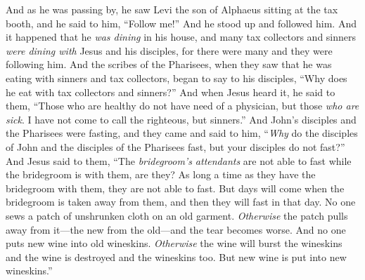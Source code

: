 \begin{biblechapter}
\verse And as he was passing by, he saw Levi the son of Alphaeus sitting at the tax booth, and he said to him, “Follow me!” And he stood up and followed him.
\verse And it happened that he \textit{was dining} in his house, and many tax collectors and sinners \textit{were dining with} Jesus and his disciples, for there were many and they were following him.
\verse And the scribes of the Pharisees, when they saw that he was eating with sinners and tax collectors, began to say to his disciples, “Why does he eat with tax collectors and sinners?”
\verse And when Jesus heard it, he said to them, “Those who are healthy do not have need of a physician, but those \textit{who are sick}. I have not come to call the righteous, but sinners.”
 And John’s disciples and the Pharisees were fasting, and they came and said to him, “\textit{Why} do the disciples of John and the disciples of the Pharisees fast, but your disciples do not fast?”
\verse And Jesus said to them, “The \textit{bridegroom’s attendants} are not able to fast while the bridegroom is with them, are they? As long a time as they have the bridegroom with them, they are not able to fast.
\verse But days will come when the bridegroom is taken away from them, and then they will fast in that day.
\verse No one sews a patch of unshrunken cloth on an old garment. \textit{Otherwise} the patch pulls away from it—the new from the old—and the tear becomes worse.
\verse And no one puts new wine into old wineskins. \textit{Otherwise} the wine will burst the wineskins and the wine is destroyed and the wineskins too. But new wine is put into new wineskins.”

\end{biblechapter}
